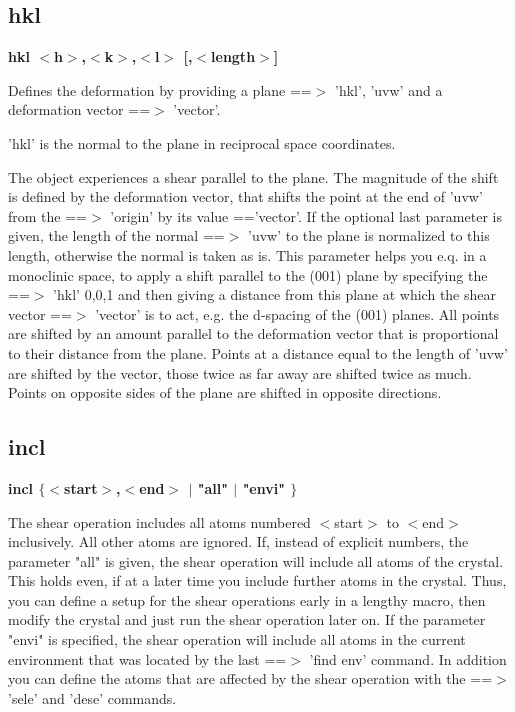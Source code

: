 \subsection*{hkl}
{\bf hkl $ <$h$> $,$ <$k$> $,$ <$l$> $ [,$ <$length$> $] \par }
\par
\vspace{3pt}
Defines the deformation by providing a plane ==$> $ 'hkl', 'uvw' and 
a deformation vector ==$> $ 'vector'. 
\par
'hkl' is the normal to the plane in reciprocal space coordinates. 
\par
The object experiences a shear parallel to the plane. The 
magnitude of the shift is defined by the deformation vector, 
that shifts the point at the end of 'uvw' from the ==$> $ 'origin' 
by its value =='vector'. 
If the optional last parameter is given, the length of the normal 
==$> $ 'uvw' to the plane is normalized to this length, otherwise the 
normal is taken as is. This parameter helps you e.q. in a monoclinic 
space, to apply a shift parallel to the (001) plane by specifying 
the ==$> $ 'hkl' 0,0,1 and then giving a distance from this plane at 
which the shear vector ==$> $ 'vector' is to act, e.g. the d-spacing 
of the (001) planes. 
All points are shifted by an amount parallel to the deformation vector 
that is proportional to their distance from the plane. Points at 
a distance equal to the length of 'uvw' are shifted by the vector, 
those twice as far away are shifted twice as much. Points on 
opposite sides of the plane are shifted in opposite directions. 
\subsection*{incl}
{\bf incl $ \{$$ <$start$> $,$ <$end$> $ $| $ "all" $| $ "envi" $\} $ \par }
\par
\vspace{3pt}
The shear operation includes all atoms numbered $ <$start$> $ to $ <$end$> $ 
inclusively. All other atoms are ignored. 
If, instead of explicit numbers, the parameter "all" is given, the 
shear operation will include all atoms of the crystal. This holds 
even, if at a later time you include further atoms in the crystal. 
Thus, you can define a setup for the shear operations early in a 
lengthy macro, then modify the crystal and just run the shear 
operation later on. 
If the parameter "envi" is specified, the shear operation will 
include all atoms in the current environment that was located by the 
last ==$> $ 'find env' command. 
In addition you can define the atoms that are affected by the 
shear operation with the ==$> $'sele' and 'dese' commands. 
